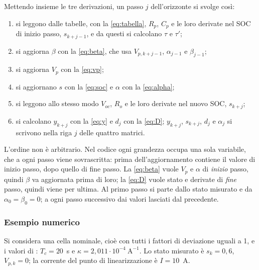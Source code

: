 \documentclass[11pt,a4paper]{article}
\newcommand{\file}[1]{\texttt{\detokenize{#1}}}
\newcommand{\Tc}{T_c}
\begin{document}
Mettendo insieme le tre derivazioni, un passo $j$ dell'orizzonte si svolge
così:
\begin{enumerate}
  \item si leggono dalle tabelle, con la \eqref{eq:tabella}, $R_p$, $C_p$ e le
        loro derivate nel SOC di inizio passo, $s_{k+j-1}$, e da questi si
        calcolano $\tau$ e $\tau'$;
  \item si aggiorna $\beta$ con la \eqref{eq:beta}, che usa $V_{p,k+j-1}$,
        $\alpha_{j-1}$ e $\beta_{j-1}$;
  \item si aggiorna $V_p$ con la \eqref{eq:vp};
  \item si aggiornano $s$ con la \eqref{eq:soc} e $\alpha$ con la
        \eqref{eq:alpha};
  \item si leggono allo stesso modo $V_{oc}$, $R_o$ e le loro derivate nel
        nuovo SOC, $s_{k+j}$;
  \item si calcolano $y_{k+j}$ con la \eqref{eq:y} e $d_j$ con la
        \eqref{eq:D}; $y_{k+j}$, $s_{k+j}$, $d_j$ e $\alpha_j$ si scrivono
        nella riga $j$ delle quattro matrici.
\end{enumerate}
L'ordine non è arbitrario. Nel codice ogni grandezza occupa una sola
variabile, che a ogni passo viene sovrascritta: prima dell'aggiornamento
contiene il valore di inizio passo, dopo quello di fine passo. La
\eqref{eq:beta} vuole $V_p$ e $\alpha$ di \emph{inizio} passo, quindi $\beta$
va aggiornata prima di loro; la \eqref{eq:D} vuole stato e derivate di
\emph{fine} passo, quindi viene per ultima. Al primo passo si parte dallo
stato misurato e da $\alpha_0 = \beta_0 = 0$; a ogni passo successivo dai
valori lasciati dal precedente.

\subsubsection{Esempio numerico}

Si considera una cella nominale, cioè con tutti i fattori di deviazione uguali
a 1, e i valori di \file{init_parametri.m}: $\Tc = 20$~s e
$\kappa = 2{,}011 \cdot 10^{-4}~\mathrm{A}^{-1}$. Lo stato misurato è
$s_k = 0{,}6$, $V_{p,k} = 0$; la corrente del punto di linearizzazione è
$I = 10$~A.
\end{document}
